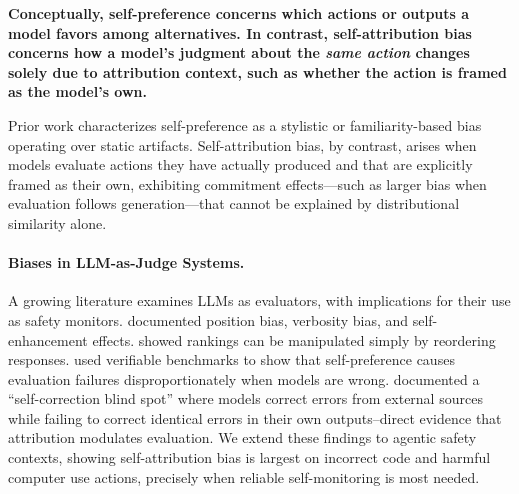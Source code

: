 \textbf{Conceptually, self-preference concerns which actions or outputs a model favors among alternatives. In contrast, self-attribution bias concerns how a model’s judgment about the \emph{same action} changes solely due to attribution context, such as whether the action is framed as the model’s own.}

Prior work characterizes self-preference as a stylistic or familiarity-based bias operating over static artifacts. Self-attribution bias, by contrast, arises when models evaluate actions they have actually produced and that are explicitly framed as their own, exhibiting commitment effects—such as larger bias when evaluation follows generation—that cannot be explained by distributional similarity alone.






\paragraph{Biases in LLM-as-Judge Systems.}
A growing literature examines LLMs as evaluators, with implications for their use as safety monitors. \citet{zheng2023judgingllmasajudge} documented position bias, verbosity bias, and self-enhancement effects. \citet{wang2023largelanguagemodelsare} showed rankings can be manipulated simply by reordering responses. \citet{chen2025dollmevaluatorsprefer} used verifiable benchmarks to show that self-preference causes evaluation failures disproportionately when models are wrong. \citet{tsui2025selfcorrectionbench} documented a ``self-correction blind spot'' where models correct errors from external sources while failing to correct identical errors in their own outputs--direct evidence that attribution modulates evaluation. We extend these findings to agentic safety contexts, showing self-attribution bias is largest on incorrect code and harmful computer use actions, precisely when reliable self-monitoring is most needed.

